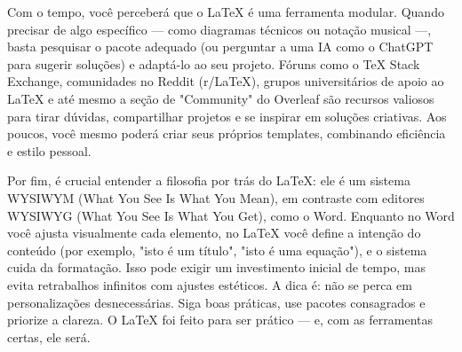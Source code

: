 Com o tempo, você perceberá que o LaTeX é uma ferramenta modular. Quando precisar de algo específico — como diagramas técnicos ou notação musical —, basta pesquisar o pacote adequado (ou perguntar a uma IA como o ChatGPT para sugerir soluções) e adaptá-lo ao seu projeto. Fóruns como o TeX Stack Exchange, comunidades no Reddit (r/LaTeX), grupos universitários de apoio ao LaTeX e até mesmo a seção de "Community" do Overleaf são recursos valiosos para tirar dúvidas, compartilhar projetos e se inspirar em soluções criativas. Aos poucos, você mesmo poderá criar seus próprios templates, combinando eficiência e estilo pessoal.

Por fim, é crucial entender a filosofia por trás do LaTeX: ele é um sistema WYSIWYM (What You See Is What You Mean), em contraste com editores WYSIWYG (What You See Is What You Get), como o Word. Enquanto no Word você ajusta visualmente cada elemento, no LaTeX você define a intenção do conteúdo (por exemplo, "isto é um título", "isto é uma equação"), e o sistema cuida da formatação. Isso pode exigir um investimento inicial de tempo, mas evita retrabalhos infinitos com ajustes estéticos. A dica é: não se perca em personalizações desnecessárias. Siga boas práticas, use pacotes consagrados e priorize a clareza. O LaTeX foi feito para ser prático — e, com as ferramentas certas, ele será.

\clearpage
\pagestyle{plain} %
